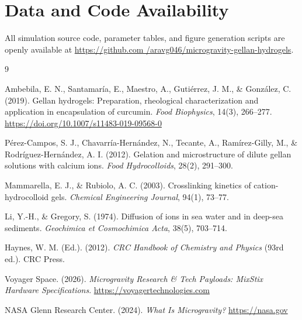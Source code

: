 \documentclass[11pt,twocolumn]{article}
\begin{document}
\section*{Data and Code Availability}
All simulation source code, parameter tables, and figure generation scripts are openly available at \url{https://github.com  /aravg046/microgravity-gellan-hydrogels}.

\begin{thebibliography}{9}

Ambebila, E. N., Santamar\'ia, E., Maestro, A., Guti\'errez, J. M., \& Gonz\'alez, C. (2019).
Gellan hydrogels: Preparation, rheological characterization and application in encapsulation of curcumin.
\emph{Food Biophysics}, 14(3), 266--277. \url{https://doi.org/10.1007/s11483-019-09568-0}

P\'erez-Campos, S. J., Chavarr\'ia-Hern\'andez, N., Tecante, A., Ram\'irez-Gilly, M., \& Rodr\'iguez-Hern\'andez, A. I. (2012).
Gelation and microstructure of dilute gellan solutions with calcium ions.
\emph{Food Hydrocolloids}, 28(2), 291--300.

Mammarella, E. J., \& Rubiolo, A. C. (2003).
Crosslinking kinetics of cation-hydrocolloid gels.
\emph{Chemical Engineering Journal}, 94(1), 73--77.

Li, Y.-H., \& Gregory, S. (1974).
Diffusion of ions in sea water and in deep-sea sediments.
\emph{Geochimica et Cosmochimica Acta}, 38(5), 703--714.

Haynes, W. M. (Ed.). (2012).
\emph{CRC Handbook of Chemistry and Physics} (93rd ed.). CRC Press.

Voyager Space. (2026).
\emph{Microgravity Research \& Tech Payloads: MixStix Hardware Specifications}.
\url{https://voyagertechnologies.com}

NASA Glenn Research Center. (2024).
\emph{What Is Microgravity?}
\url{https://nasa.gov}

\end{thebibliography}
\end{document}
